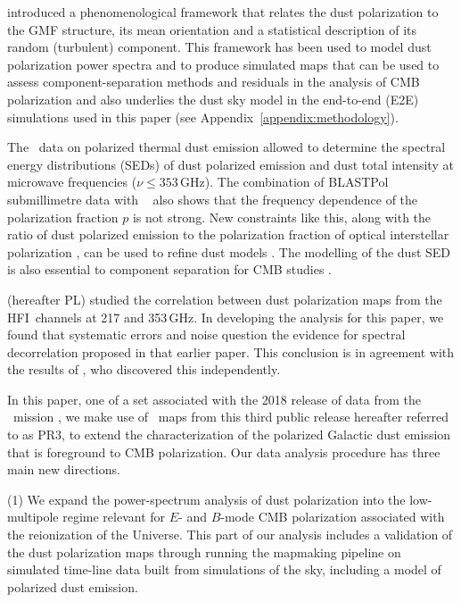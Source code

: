 \documentclass[longauth,traditabstract]{aa}
\newcommand{\HFI}{HFI}
\newcommand{\PR}{PR3}
\begin{document}
\citet{planck2016-XLIV} introduced a phenomenological framework that relates the dust polarization to the GMF structure, its mean orientation and a 
statistical description of its random (turbulent) component. This framework has been used to model dust polarization power spectra 
and to produce simulated maps that can be used to 
assess component-separation methods and residuals in the analysis of CMB polarization \citep{Ghosh16,Vansyngel16} and also underlies the dust sky model in the end-to-end (E2E) simulations used in this paper (see Appendix~\ref{appendix:methodology}). 

The \Planck\ data on polarized thermal dust emission allowed \citet{planck2014-XXII} to determine
the spectral energy distributions (SEDs) of dust polarized emission and dust total intensity at microwave frequencies ($\nu \le 353\,$GHz).  The combination of BLASTPol submillimetre data with \Planck\ \citep{Gandilo2016,Ashton2017} also shows that the frequency dependence of the polarization fraction $p$ is not strong.
New constraints like this, along with the ratio of dust polarized emission to the polarization fraction of optical interstellar polarization \citep{planck2014-XXI}, can be used to refine dust models \citep{Guillet17}.
The modelling of the dust SED is also essential to component separation for CMB studies \citep{Chluba17,Hensley17}.

\citet{planck2016-L} (hereafter PL) studied the correlation between dust polarization maps from the \HFI\ channels at 217 and 353\,GHz.  In developing the analysis for this paper, we found that systematic errors and noise question the evidence for spectral decorrelation proposed in that earlier paper. This conclusion is in agreement with the results of \citet{Sheehy17}, who discovered this independently. 

In this paper, one of a set associated with the 2018 release of data from the \Planck\ mission \citep{planck2016-l01}, we make use of \Planck\ maps from this third public release
hereafter referred to as \PR, to extend the characterization of
the polarized Galactic dust emission that is foreground to CMB polarization. Our data analysis procedure has three main new directions.


\noindent
(1) We expand the power-spectrum analysis of dust polarization into the low-multipole regime relevant for $E$- and $B$-mode CMB polarization associated with the reionization of the Universe.
This part of our analysis includes a validation of the dust polarization maps through running the mapmaking pipeline on simulated time-line data built from simulations of the sky, including a model of polarized dust emission.
\end{document}
